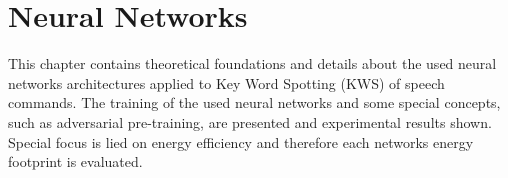 
\chapter{Neural Networks}\label{sec:nn}
This chapter contains theoretical foundations and details about the used neural networks architectures applied to Key Word Spotting (KWS) of speech commands.
The training of the used neural networks and some special concepts, such as adversarial pre-training, are presented and experimental results shown.
Special focus is lied on energy efficiency and therefore each networks energy footprint is evaluated.







